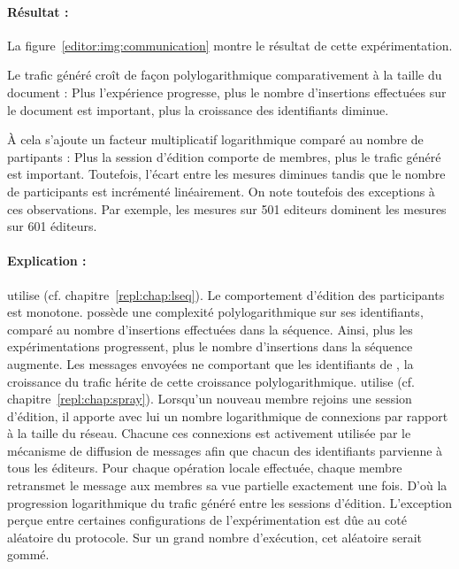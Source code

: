 \paragraph{Résultat :} La figure~\ref{editor:img:communication} montre le
résultat de cette expérimentation.
\begin{inparaenum}[(i)]
\item Le trafic généré croît de façon polylogarithmique comparativement à la
  taille du document : Plus l'expérience progresse, plus le nombre d'insertions
  effectuées sur le document est important, plus la croissance des identifiants
  diminue.
\item À cela s'ajoute un facteur multiplicatif logarithmique comparé au nombre
  de partipants : Plus la session d'édition comporte de membres, plus le trafic
  généré est important. Toutefois, l'écart entre les mesures diminues tandis que
  le nombre de participants est incrémenté linéairement. On note toutefois des
  exceptions à ces observations. Par exemple, les mesures sur 501 editeurs
  dominent les mesures sur 601 éditeurs.
\end{inparaenum}

\paragraph{Explication :} \CRATE utilise \LSEQ
(cf. chapitre~\ref{repl:chap:lseq}). Le comportement d'édition des participants
est monotone. \LSEQ possède une complexité polylogarithmique sur ses
identifiants, comparé au nombre d'insertions effectuées dans la séquence. Ainsi,
plus les expérimentations progressent, plus le nombre d'insertions dans la
séquence augmente. Les messages envoyées ne comportant que les identifiants de
\LSEQ, la croissance du trafic hérite de cette croissance
polylogarithmique. \CRATE utilise \SPRAY
(cf. chapitre~\ref{repl:chap:spray}). Lorsqu'un nouveau membre rejoins une
session d'édition, il apporte avec lui un nombre logarithmique de connexions par
rapport à la taille du réseau. Chacune ces connexions est activement utilisée
par le mécanisme de diffusion de messages afin que chacun des identifiants
parvienne à tous les éditeurs. Pour chaque opération locale effectuée, chaque
membre retransmet le message aux membres sa vue partielle exactement une
fois. D'où la progression logarithmique du trafic généré entre les sessions
d'édition. L'exception perçue entre certaines configurations de
l'expérimentation est dûe au coté aléatoire du protocole. Sur un grand nombre
d'exécution, cet aléatoire serait gommé.


